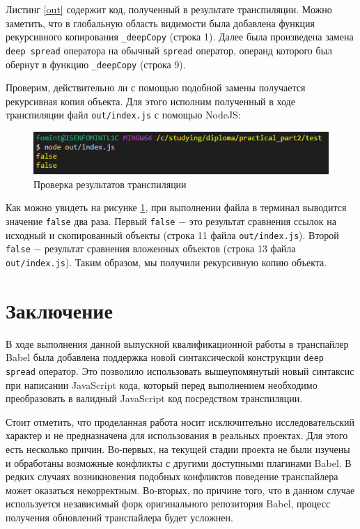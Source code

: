 \documentclass[14pt, a4paper]{article}
\def\code#1{\texttt{#1}} %
\begin{document}


Листинг \ref{out} содержит код, полученный в результате транспиляции. Можно заметить, что в глобальную
область видимости была добавлена функция рекурсивного копирования \code{\_deepCopy} (строка 1).
Далее была произведена замена \code{deep spread} оператора на обычный \code{spread} оператор, операнд
которого был обернут в функцию \code{\_deepCopy} (строка 9).

Проверим, действительно ли с помощью подобной замены получается рекурсивная копия объекта. Для этого
исполним полученный в ходе транспиляции файл \code{out/index.js} с помощью NodeJS:

\begin{figure}[H]
  \centering
  \includegraphics[scale=1.0]{img/test_results.PNG}
  \caption{Проверка результатов транспиляции}
  \label{test_results}
\end{figure}
Как можно увидеть на рисунке \ref{test_results}, при выполнении файла в терминал выводится значение
\code{false} два раза. Первый \code{false} $-$ это результат сравнения ссылок на исходный и
скопированный объекты (строка 11 файла \code{out/index.js}). Второй \code{false} $-$ результат сравнения
вложенных объектов (строка 13 файла \code{out/index.js}). Таким образом, мы получили рекурсивную копию
объекта.

\pagebreak
\section{Заключение}
В ходе выполнения данной выпускной квалификационной работы в транспайлер Babel была добавлена
поддержка новой синтаксической конструкции \code{deep spread} оператор. Это позволило использовать
вышеупомянутый новый синтаксис при написании JavaScript кода, который перед выполнением необходимо
преобразовать в валидный JavaScript код посредством транспиляции.

Стоит отметить, что проделанная работа носит исключительно исследовательский характер и не предназначена для
использования в реальных проектах. Для этого есть несколько причин. Во-первых, на текущей стадии
проекта не были изучены и обработаны возможные конфликты с другими доступными плагинами Babel. В
редких случаях возникновения подобных конфликтов поведение транспайлера может оказаться некорректным.
Во-вторых, по причине того, что в данном случае используется независимый форк оригинального репозитория
Babel, процесс получения обновлений транспайлера будет усложнен.
\end{document}
